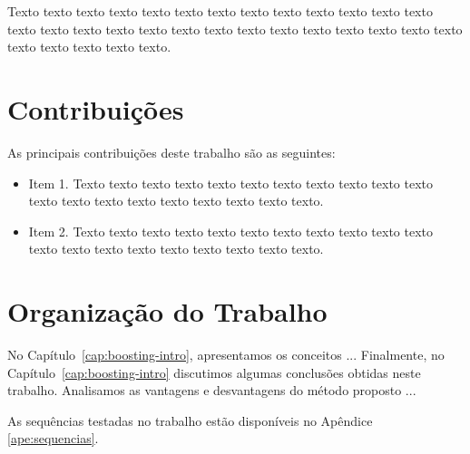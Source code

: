 Texto texto texto texto texto texto texto texto texto texto texto texto texto
texto texto texto texto texto texto texto texto texto texto texto texto texto
texto texto texto texto texto texto.

\section{Contribuições}
\label{sec:contribucoes}

As principais contribuições deste trabalho são as seguintes:

\begin{itemize}
  \item Item 1. Texto texto texto texto texto texto texto texto texto texto
  texto texto texto texto texto texto texto texto texto texto.

  \item Item 2. Texto texto texto texto texto texto texto texto texto texto
  texto texto texto texto texto texto texto texto texto texto.

\end{itemize}

\section{Organização do Trabalho}
\label{sec:organizacao_trabalho}

No Capítulo~\ref{cap:boosting-intro}, apresentamos os conceitos ... Finalmente, no
Capítulo~\ref{cap:boosting-intro} discutimos algumas conclusões obtidas neste
trabalho. Analisamos as vantagens e desvantagens do método proposto ... 

As sequências testadas no trabalho estão disponíveis no Apêndice \ref{ape:sequencias}.
